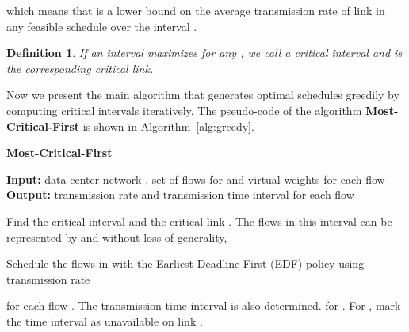 \documentclass[10pt, conference, compsocconf]{IEEEtran}
\newtheorem{definition}{Definition}
\begin{document}
which means that  is a lower bound on the average transmission rate of link  in any feasible schedule over the interval .
\begin{definition}
If an interval  maximizes  for any , we call  a critical interval and  is the corresponding critical link.
\end{definition}
Now we present the main algorithm that generates optimal schedules greedily by computing critical intervals iteratively. The pseudo-code of the algorithm \textbf{Most-Critical-First} is shown in Algorithm~\ref{alg:greedy}.
\begin{algorithm}[!t]
\caption{\label{alg:greedy} \textbf{Most-Critical-First}}
\textbf{Input:} data center network , set of flows  for  and virtual weights  for each flow\\
\textbf{Output:} transmission rate  and transmission time interval  for each flow 

\begin{algorithmic}[1]
\WHILE{}
	\STATE Find the critical interval  and the critical link . The flows in this interval can be represented by  and without loss of generality, 
	
	\STATE Schedule the flows in  with the Earliest Deadline First (EDF) policy using transmission rate 
	
	for each flow . The transmission time interval  is also determined.
	\FOR{}
		\STATE  for .
		\STATE For , mark the time interval  as unavailable on link .
	\ENDFOR
\ENDWHILE
\end{algorithmic}
\end{algorithm}
\end{document}
